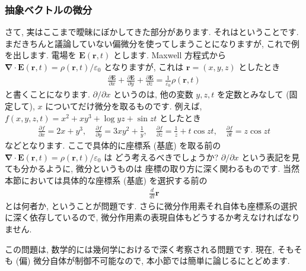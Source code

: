 \documentclass[openany, a4paper, oneside]{jsbook}
\theoremstyle{break}
\theoremstyle{breakdefn}
\newcommand{\vep}{\varepsilon}
\begin{document}
\subsubsection{抽象ベクトルの微分}


さて, 実はここまで曖昧にぼかしてきた部分があります.
それはということです.
まだきちんと議論していない偏微分を使ってしまうことになりますが,
これで例を出します.
電場を $\bm{E}(\bm{r}, t)$ とします.
Maxwell 方程式から $\bm{ \nabla } \cdot \bm{E}( \bm{r} , t ) = \rho ( \bm{r} , t ) / \vep_0$ となりますが,
これは $\bm{r} = (x ,y , z)$ としたとき
\begin{gather}
 \frac{ \partial \bm{E} } { \partial x } + \frac{ \partial \bm{E} } { \partial y }
  +\frac{ \partial \bm{E} } { \partial z }
 =
 \frac{1} { \vep _0 } \rho ( \bm{r} , t )
\end{gather}
と書くことになります.
$\partial / \partial x$ というのは,
他の変数 $y,z,t$ を定数とみなして (固定して),
$x$ についてだけ微分を取るものです.
例えば, $f (x, y ,z , t) = x^2 + x y^3 +  \log y z + \sin z t$ としたとき
    \begin{gather}
        \frac{ \partial f } { \partial x }
        =
        2 x + y^3 ,\quad
        \frac{ \partial f } { \partial y }
        =
        3x y^2 + \frac{1} {y} ,\quad
        \frac{ \partial f } { \partial z }
        =
        \frac{1} {z} + t \cos z t ,\quad
        \frac{ \partial f } { \partial t }
        =
        z \cos z t
    \end{gather}
などとなります.
ここで具体的に座標系 (基底) を取る前の $\bm{ \nabla } \cdot \bm{E}( \bm{r} , t ) = \rho ( \bm{r} , t ) / \vep_0$ は
どう考えるべきでしょうか?
$\partial / \partial x$ という表記を見ても分かるように, 微分というものは
座標の取り方に深く関わるものです.
当然本節においては具体的な座標系 (基底) を選択する前の
    \begin{gather}
        \frac{d} {dt} \bm{r}
    \end{gather}
とは何者か, ということが問題です.
さらに微分作用素それ自体も座標系の選択に深く依存しているので,
微分作用素の表現自体もどうするか考えなければなりません.

この問題は, 数学的には幾何学におけるで深く考察される問題です.
現在, そもそも (偏) 微分自体が制御不可能なので, 本小節では簡単に論じるにとどめます.
\end{document}
